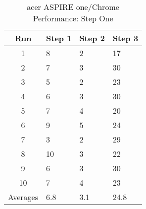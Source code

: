 \begin{table}
  \begin{center}
  \begin{tabular}{| c | l | l | l |}
    \hline
    Run          & Step 1 & Step 2 & Step 3 \\ \hline
    1            & 8      & 2      & 17     \\ \hline
    2            & 7      & 3      & 30     \\ \hline
    3            & 5      & 2      & 23     \\ \hline
    4            & 6      & 3      & 30     \\ \hline
    5            & 7      & 4      & 20     \\ \hline
    6            & 9      & 5      & 24     \\ \hline
    7            & 3      & 2      & 29     \\ \hline
    8            & 10     & 3      & 22     \\ \hline
    9            & 6      & 3      & 30     \\ \hline
    10           & 7      & 4      & 23     \\ \hline
    Averages     & 6.8    & 3.1    & 24.8   \\
    \hline
  \end{tabular}
  \caption{acer ASPIRE one/Chrome Performance: Step One}
  \label{aspChrPerf}
  \end{center}
\end{table}
